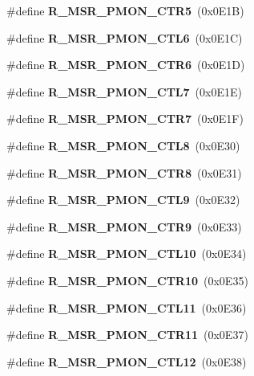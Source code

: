 \begin{DoxyCompactItemize}
\item 
\mbox{\label{types_8h_a9a14e26164ee41a8d3976b1fbc71607f}} 
\#define {\bfseries R\+\_\+\+M\+S\+R\+\_\+\+P\+M\+O\+N\+\_\+\+C\+T\+R5}~(0x0\+E1\+B)
\item 
\mbox{\label{types_8h_a68cc99e6775534a5cb0ecedf899a6603}} 
\#define {\bfseries R\+\_\+\+M\+S\+R\+\_\+\+P\+M\+O\+N\+\_\+\+C\+T\+L6}~(0x0\+E1\+C)
\item 
\mbox{\label{types_8h_a0bc6e0e035540942d0389ad21f4a410f}} 
\#define {\bfseries R\+\_\+\+M\+S\+R\+\_\+\+P\+M\+O\+N\+\_\+\+C\+T\+R6}~(0x0\+E1\+D)
\item 
\mbox{\label{types_8h_a3b7d38eb7ebbc05767c7529b58e5b88d}} 
\#define {\bfseries R\+\_\+\+M\+S\+R\+\_\+\+P\+M\+O\+N\+\_\+\+C\+T\+L7}~(0x0\+E1\+E)
\item 
\mbox{\label{types_8h_acb45653fb69da0436db21244ed0bb483}} 
\#define {\bfseries R\+\_\+\+M\+S\+R\+\_\+\+P\+M\+O\+N\+\_\+\+C\+T\+R7}~(0x0\+E1\+F)
\item 
\mbox{\label{types_8h_a05ca8d6b245c3a6cb0d3681cdc38714c}} 
\#define {\bfseries R\+\_\+\+M\+S\+R\+\_\+\+P\+M\+O\+N\+\_\+\+C\+T\+L8}~(0x0\+E30)
\item 
\mbox{\label{types_8h_a7a4e1a1332f20698b0fd8a6eeb85dfd8}} 
\#define {\bfseries R\+\_\+\+M\+S\+R\+\_\+\+P\+M\+O\+N\+\_\+\+C\+T\+R8}~(0x0\+E31)
\item 
\mbox{\label{types_8h_a87db7f30713c117648fd0c3a592d9e92}} 
\#define {\bfseries R\+\_\+\+M\+S\+R\+\_\+\+P\+M\+O\+N\+\_\+\+C\+T\+L9}~(0x0\+E32)
\item 
\mbox{\label{types_8h_af7f2703451a13e9ad20f39e17241d38c}} 
\#define {\bfseries R\+\_\+\+M\+S\+R\+\_\+\+P\+M\+O\+N\+\_\+\+C\+T\+R9}~(0x0\+E33)
\item 
\mbox{\label{types_8h_ab157e96921e6d2d790262bbc56bf82fc}} 
\#define {\bfseries R\+\_\+\+M\+S\+R\+\_\+\+P\+M\+O\+N\+\_\+\+C\+T\+L10}~(0x0\+E34)
\item 
\mbox{\label{types_8h_a2b202210a0ccfaf0130499510b5e7215}} 
\#define {\bfseries R\+\_\+\+M\+S\+R\+\_\+\+P\+M\+O\+N\+\_\+\+C\+T\+R10}~(0x0\+E35)
\item 
\mbox{\label{types_8h_a7bff73fd6b4901add6b2c57a72031dbc}} 
\#define {\bfseries R\+\_\+\+M\+S\+R\+\_\+\+P\+M\+O\+N\+\_\+\+C\+T\+L11}~(0x0\+E36)
\item 
\mbox{\label{types_8h_a6f5078153d1b8263e1c93e3756936b18}} 
\#define {\bfseries R\+\_\+\+M\+S\+R\+\_\+\+P\+M\+O\+N\+\_\+\+C\+T\+R11}~(0x0\+E37)
\item 
\mbox{\label{types_8h_afa94f7dbc5b2e29b5089f52e90704ea8}} 
\#define {\bfseries R\+\_\+\+M\+S\+R\+\_\+\+P\+M\+O\+N\+\_\+\+C\+T\+L12}~(0x0\+E38)

\end{DoxyCompactItemize}
